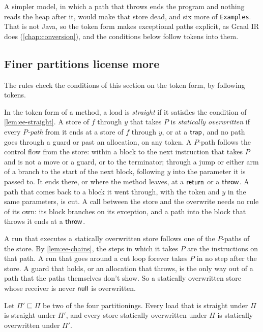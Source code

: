 A simpler model, in which a path that throws ends the program and nothing reads
the heap after it, would make that store dead, and six more of
\texttt{Examples}. That is not Java, so the token form makes exceptional paths
explicit, as Graal IR does (\cref{chap:conversion}), and the conditions below
follow tokens into them.

\subsection{Finer partitions license more}\label{sec:ee-monotone}

The rules check the conditions of this section on the token form, by following
tokens.

\begin{definition}\label{def:ee-static}
In the token form of a method, a load is \emph{straight} if it satisfies the
condition of \cref{lem:ee-straight}. A store of $f$ through $y$ that takes $P$
is \emph{statically overwritten} if every \emph{$P$-path} from it ends at a store
of $f$ through $y$, or at a $\mathsf{trap}$, and no path goes through a guard or past
an allocation, on any token. A $P$-path follows the control flow from the store:
within a block to the next instruction that takes $P$ and is not a move or a
guard, or to the terminator; through a jump or either arm of a branch to the
start of the next block, following $y$ into the parameter it is passed to. It
ends there, or where the method leaves, at a $\mathsf{return}$ or a $\mathsf{throw}$. A path that
comes back to a block it went through, with the token and $y$ in the same
parameters, is cut. A call between the store and the overwrite needs no rule of
its own: its block branches on its exception, and a path into the block that
throws it ends at a $\mathsf{throw}$.
\end{definition}

A run that executes a statically overwritten store follows one of the
$P$-paths of the store. By \cref{lem:ee-chains}, the steps in which it takes
$P$ are the instructions on that path. A run that goes around a cut loop forever takes $P$
in no step after the store. A guard that holds, or an allocation that throws,
is the only way out of a path that the paths themselves don't show. So a
statically overwritten store whose receiver is never $\mathsf{null}$ is overwritten.

\begin{theorem}[Monotonicity]\label{thm:ee-monotone}
Let $\Pi' \sqsubseteq \Pi$ be two of the four partitionings. Every load that is
straight under $\Pi$ is straight under $\Pi'$, and every store statically
overwritten under $\Pi$ is statically overwritten under $\Pi'$.
\end{theorem}

